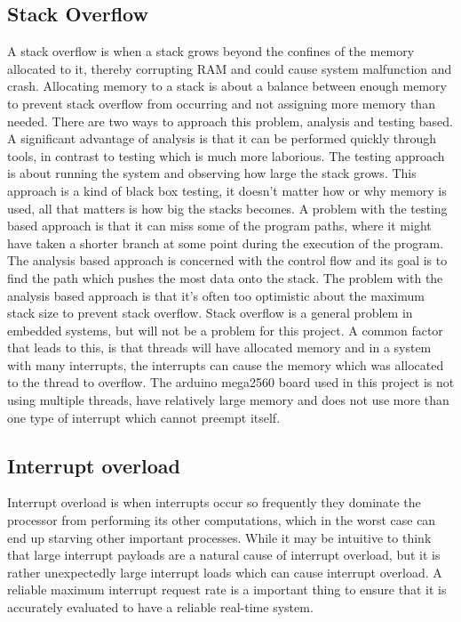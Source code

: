 \subsection{Stack Overflow}
\label{sec:Stack Overflow}
A stack overflow is when a stack grows beyond the confines of the memory allocated to it, thereby corrupting RAM and could cause system malfunction and crash. Allocating memory to a stack is about a balance between enough memory to prevent stack overflow from occurring and not assigning more memory than needed. There are two ways to approach this problem, analysis and testing based. A significant advantage of analysis is that it can be performed quickly through tools, in contrast to testing which is much more laborious. \newline 
The testing approach is about running the system and observing how large the stack grows. This approach is a kind of black box testing, it doesn’t matter how or why memory is used, all that matters is how big the stacks becomes. A problem with the testing based approach is that it can miss some of the program paths, where it might have taken a shorter branch at some point during the execution of the program. \newline
The analysis based approach is concerned with the control flow and its goal is to find the path which pushes the most data onto the stack. The problem with the analysis based approach is that it's often too optimistic about the maximum stack size to prevent stack overflow. \newline
Stack overflow is a general problem in embedded systems, but will not be a problem for this project. A common factor that leads to this, is that threads will have allocated memory and in a system with many interrupts, the interrupts can cause the memory which was allocated to the thread to overflow. The arduino mega2560 board used in this project is not using multiple threads, have relatively large memory and does not use more than one type of interrupt which cannot preempt itself. 


\subsection{Interrupt overload}
\label{sec:Interrupt overload}
Interrupt overload is when interrupts occur so frequently they dominate the processor from performing its other computations, which in the worst case can end up starving other important processes. While it may be intuitive to think that large interrupt payloads are a natural cause of interrupt overload, but it is rather unexpectedly large interrupt loads which can cause interrupt overload. A reliable maximum interrupt request rate is a important thing to ensure that it is accurately evaluated to have a reliable real-time system.


